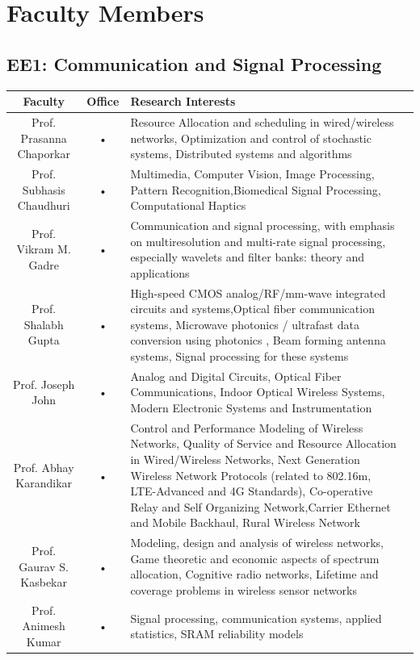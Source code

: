 \documentclass[11pt,fleqn,openany]{book} %
\begin{document}
\chapter{Faculty Members}
\section{EE1: Communication and Signal Processing}
\begin{tabular}{|c|c|p{6cm}|c}
\hline 
Faculty  & Office  & Research Interests \\ 
\hline
Prof. Prasanna Chaporkar & • & Resource Allocation and scheduling in wired/wireless networks, Optimization and control of stochastic systems, Distributed systems and algorithms \\ 
\hline 
Prof. Subhasis Chaudhuri & • & Multimedia, Computer Vision, Image Processing, Pattern Recognition,Biomedical Signal Processing, Computational Haptics \\ 
\hline 
Prof. Vikram M. Gadre & • & Communication and signal processing, with emphasis on multiresolution
and multi-rate signal processing, especially wavelets and filter banks:
theory and applications \\ 
\hline 
Prof. Shalabh Gupta & • & High-speed CMOS analog/RF/mm-wave integrated circuits and systems,Optical fiber communication systems, Microwave photonics / ultrafast data  conversion using photonics , Beam forming antenna systems, Signal processing for these systems \\ 
\hline 
Prof. Joseph John & • & Analog and Digital Circuits, Optical Fiber Communications, Indoor Optical Wireless Systems, Modern Electronic Systems and Instrumentation \\ 
\hline 
Prof. Abhay Karandikar & • & Control and Performance Modeling of Wireless Networks, Quality of Service and Resource Allocation in Wired/Wireless Networks, Next Generation Wireless Network Protocols (related to 802.16m, LTE-Advanced and 4G Standards), Co-operative Relay and Self Organizing Network,Carrier Ethernet and Mobile Backhaul, Rural Wireless Network \\ 
\hline 
Prof. Gaurav S. Kasbekar& • & Modeling, design and analysis of wireless networks, Game theoretic and economic aspects of spectrum allocation, Cognitive radio networks,
Lifetime and coverage problems in wireless sensor networks \\ 
\hline 
Prof. Animesh Kumar  & • & Signal processing, communication systems, applied statistics, SRAM reliability models \\ 
\hline 
\end{tabular} 
\end{document}
